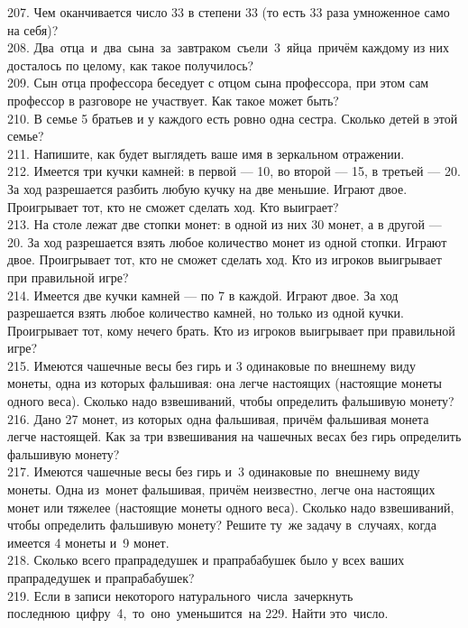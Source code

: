 \documentclass[12pt]{article}
\begin{document}
207. Чем оканчивается число 33 в степени 33 (то есть 33 раза умноженное само на себя)?\\
208. Два отца и два сына за завтраком съели 3 яйца причём каждому из них досталось по целому, как такое получилось?\\
209. Сын отца профессора беседует с отцом сына профессора, при этом сам профессор в разговоре не участвует. Как такое может быть?\\
210. В семье 5 братьев и у каждого есть ровно одна сестра. Сколько детей в этой семье?\\
211. Напишите, как будет выглядеть ваше имя в зеркальном отражении.\\
212. Имеется три кучки камней: в первой --- 10, во второй --- 15, в третьей --- 20. За ход разрешается разбить любую кучку на две меньшие. Играют двое. Проигрывает тот, кто не сможет сделать ход. Кто выиграет?\\
213. На столе лежат две стопки монет: в одной из них 30 монет, а в другой --- 20. За ход разрешается взять любое количество монет из одной стопки. Играют двое. Проигрывает тот, кто не сможет сделать ход. Кто из игроков выигрывает при правильной игре?\\
214. Имеется две кучки камней --- по 7 в каждой. Играют двое. За ход разрешается взять любое количество камней, но только из одной кучки. Проигрывает тот, кому нечего брать. Кто из игроков выигрывает при правильной игре?\\
215. Имеются чашечные весы без гирь и 3 одинаковые по внешнему виду монеты, одна из которых фальшивая: она легче настоящих (настоящие монеты одного веса). Сколько надо взвешиваний, чтобы определить фальшивую монету?\\
216. Дано 27 монет, из которых одна фальшивая, причём фальшивая монета легче настоящей. Как за три взвешивания на чашечных весах без гирь определить фальшивую монету?\\
217. Имеются чашечные весы без гирь и 3 одинаковые по внешнему виду монеты. Одна из монет фальшивая, причём неизвестно, легче она настоящих монет или тяжелее (настоящие монеты одного веса). Сколько надо взвешиваний, чтобы определить фальшивую монету? Решите ту же задачу в случаях, когда имеется 4 монеты и 9 монет.\\
218. Сколько всего прапрадедушек и прапрабабушек было у всех ваших прапрадедушек и прапрабабушек?\\
219. Если в записи некоторого натурального числа зачеркнуть последнюю цифру 4, то оно уменьшится на 229. Найти это число.\\
\end{document}
